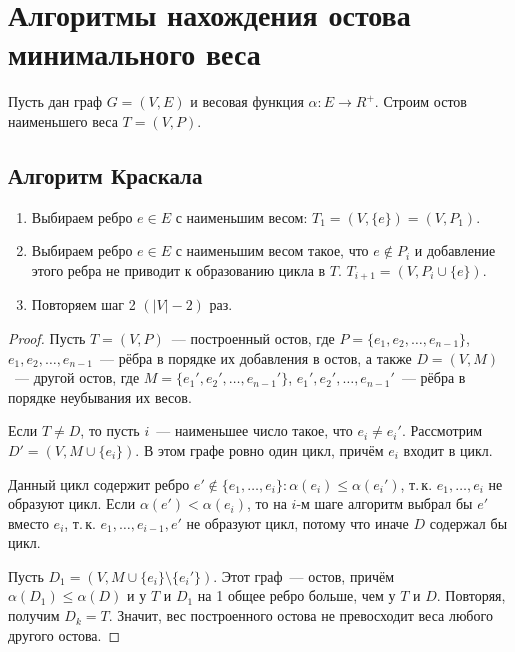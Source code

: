 \section{Алгоритмы нахождения остова минимального веса}
	Пусть дан граф $G = (V, E)$ и весовая функция $\alpha \colon E \to R^+$. Строим остов наименьшего веса $T = (V, P)$.
\subsection{Алгоритм Краскала}
\begin{enumerate}
	\item Выбираем ребро $e \in E$ с наименьшим весом: $T_1 = (V, \{ e \}) = (V, P_1)$.
	\item Выбираем ребро $e \in E$ с наименьшим весом такое, что $e \notin P_i$ и добавление этого ребра не приводит к образованию цикла в $T$. $T _{i+1} = (V, P_i \cup \{ e \})$.
	\item Повторяем шаг 2 $(|V| - 2)$ раз.
\end{enumerate}
\begin{proof}
	Пусть $T = (V, P)$~--- построенный остов, где $P = \{ e_1, e_2, \ldots, e_{n-1} \}$, $e_1, e_2, \ldots, e_{n-1}$~--- рёбра в порядке их добавления в остов, а также $D = (V, M)$~--- другой остов, где $M = \{ e_1', e_2', \ldots, e_{n-1}' \}$, $e_1', e_2', \ldots, e_{n-1}'$~--- рёбра в порядке неубывания их весов.
	
	Если $T \neq D$, то пусть $i$~--- наименьшее число такое, что $e_i \neq e_i'$. Рассмотрим $D' = (V, M \cup \{ e_i \})$. В этом графе ровно один цикл, причём $e_i$ входит в цикл.
	
	Данный цикл содержит ребро $e' \notin \{ e_1, \ldots, e_i \} \colon \alpha(e_i) \leqslant \alpha(e_i')$, т.\,к. $e_1, \ldots, e_i$ не образуют цикл. Если $\alpha(e') < \alpha(e_i)$, то на $i$-м шаге алгоритм выбрал бы $e'$ вместо $e_i$, т.\,к. $e_1, \ldots, e_{i-1}, e'$ не образуют цикл, потому что иначе $D$ содержал бы цикл.
	
	Пусть $D_1 = (V, M \cup \{ e_i\} \setminus \{ e_i' \})$. Этот граф~--- остов, причём $\alpha(D_1) \leqslant \alpha(D)$ и у $T$ и $D_1$ на 1 общее ребро больше, чем у $T$ и $D$. Повторяя, получим $D_k = T$. Значит, вес построенного остова не превосходит веса любого другого остова.
\end{proof}

